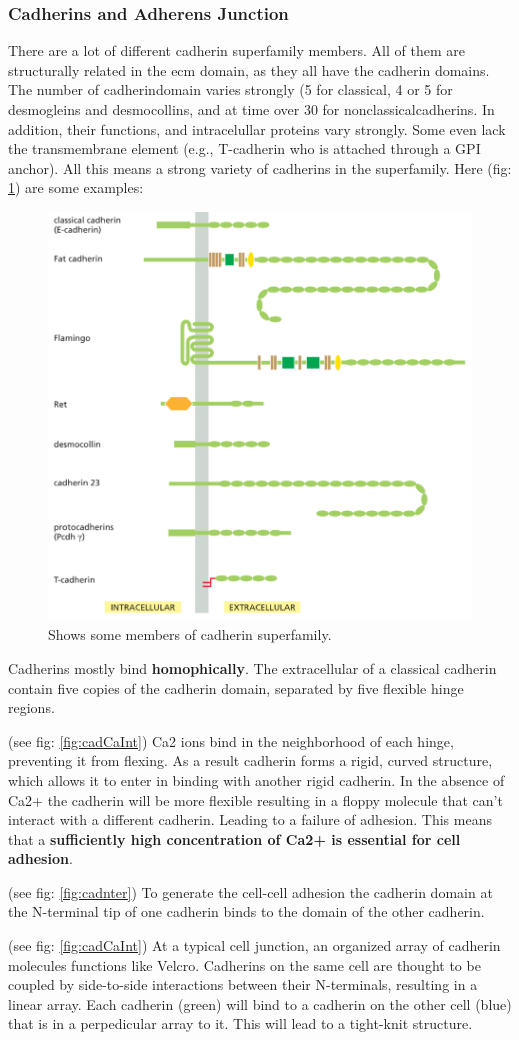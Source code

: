 \documentclass[../main.tex]{subfiles}
\begin{document}
\subsubsection{Cadherins and Adherens Junction}

There are a lot of different \gls{cadherin} superfamily members. All of them are structurally related in the ecm domain, as they all have the cadherin domains. The number of \gls{cadherindomain} varies strongly (5 for classical, 4 or 5 for \gls{desmogleins} and \gls{desmocollins}, and at time over 30 for \gls{nonclassicalcadherins}. In addition, their functions, and intracelullar proteins vary strongly. Some even lack the transmembrane element (e.g., T-cadherin who is attached through a GPI anchor). All this means a strong variety of cadherins in the superfamily. Here (fig: \ref{fig:cadsuper}) are some examples: 
\begin{figure}[H]
	\centering
	\includegraphics[width=0.3\linewidth]{cad_super}
	\caption{Shows some members of cadherin superfamily.}
	\label{fig:cadsuper}
\end{figure}

Cadherins mostly bind \textbf{homophically}. The extracellular of a classical cadherin contain five copies of the cadherin domain, separated by five flexible hinge regions. 

(see fig: \ref{fig:cadCaInt}) \gls{Ca2} ions bind in the neighborhood of each hinge, preventing it from flexing. As a result cadherin forms a rigid, curved structure, which allows it to enter in binding with another rigid cadherin. In the absence of Ca2+ the cadherin will be more flexible resulting in a floppy molecule that can't interact with a different cadherin. Leading to a failure of adhesion. This means that a \textbf{sufficiently high concentration of Ca2+ is essential for cell adhesion}.

(see fig: \ref{fig:cadnter}) To generate the cell-cell adhesion the cadherin domain at the N-terminal tip of one cadherin binds to the domain of the other cadherin.

(see fig: \ref{fig:cadCaInt}) At a typical cell junction, an organized array of cadherin molecules functions like Velcro. Cadherins on the same cell are thought to be coupled by side-to-side interactions between their N-terminals, resulting in a linear array. Each cadherin (green) will bind to a cadherin on the other cell (blue) that is in a perpedicular array to it. This will lead to a tight-knit structure.
\end{document}
